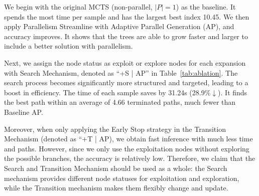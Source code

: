We begin with the original MCTS (non-parallel, $|P|=1$) as the baseline. It spends the most time per sample and has the largest best index 10.45. 
We then apply Parallelism Streamline with Adaptive Parallel Generation (AP), and accuracy improves. It shows that the trees are able to grow faster and larger to include a better solution with parallelism. 

Next, we assign the node status as exploit or explore nodes for each expansion with Search Mechanism, denoted as ``+S | AP'' in Table~\ref{tab:ablation}. 
The search process becomes significantly more structured and targeted, leading to a boost in efficiency. The time of each sample saves by 31.24s (28.9\%$\downarrow$). It finds the best path within an average of 4.66 terminated paths, much fewer than Baseline AP. 

Moreover, when only applying the Early Stop strategy in the Transition Mechanism (denoted as ``+T | AP), we obtain fast inference with much less time and paths. However, since we only use the exploitation nodes without exploring the possible branches, the accuracy is relatively low. Therefore, we claim that the Search and Transition Mechanism should be used as a whole: the Search mechanism provides different node statuses for exploitation and exploration, while the Transition mechanism makes them flexibly change and update. 

